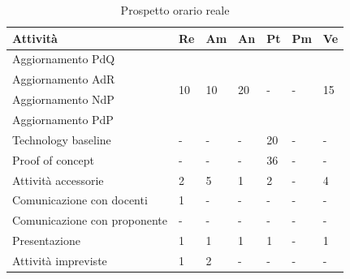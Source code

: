 \begin{table}[H]
	\centering
	\begin{tabular}{|l|l|l|l|l|l|l|}
		\hline
		\rowcolor{lighter-grayer}
		\textbf{Attività}            & \textbf{Re}         & \textbf{Am}         & \textbf{An}         & \textbf{Pt}        & \textbf{Pm}        & \textbf{Ve}         \\ \hline
		Aggiornamento PdQ            & \multirow{4}{*}{10} & \multirow{4}{*}{10} & \multirow{4}{*}{20} & \multirow{4}{*}{-} & \multirow{4}{*}{-} & \multirow{4}{*}{15} \\ \cline{1-1}
		Aggiornamento AdR            &                     &                     &                     &                    &                    &                     \\ \cline{1-1}
		Aggiornamento NdP            &                     &                     &                     &                    &                    &                     \\ \cline{1-1}
		Aggiornamento PdP            &                     &                     &                     &                    &                    &                     \\ \hline
		Technology baseline          & -                   & -                   & -                   & 20                 & -                  & -                   \\ \hline
		Proof of concept             & -                   & -                   & -                   & 36                 & -                  & -                   \\ \hline
		Attività accessorie          & 2                   & 5                   & 1                   & 2                  & -                  & 4                   \\ \hline
		Comunicazione con docenti    & 1                   & -                   & -                   & -                  & -                  & -                   \\ \hline
		Comunicazione con proponente & -                   & -                   & -                   & -                  & -                  & -                   \\ \hline
		Presentazione                & 1                   & 1                   & 1                   & 1                  & -                  & 1                   \\ \hline
		Attività impreviste          & 1                   & 2                   & -                   & -                  & -                  & -                   \\ \hline
	\end{tabular}
	\caption{ Prospetto orario reale\\}
\end{table}

